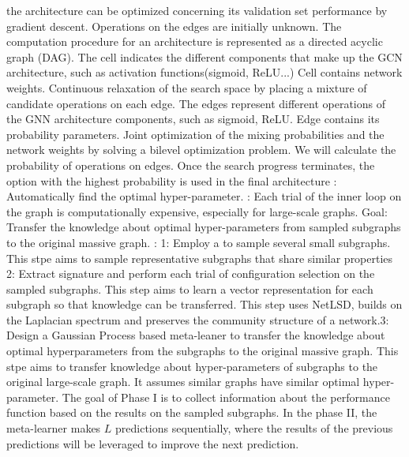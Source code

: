 the architecture can be optimized concerning its validation set performance by gradient descent.  Operations on the edges are initially unknown. The computation procedure for an architecture is represented as a directed acyclic graph (DAG). The cell indicates the different components that make up the GCN architecture, such as activation functions(sigmoid, ReLU...) Cell contains network weights.  Continuous relaxation of the search space by placing a mixture of candidate operations on each edge. The edges represent different operations of the GNN architecture components, such as sigmoid, ReLU. Edge contains its probability parameters.  Joint optimization of the mixing probabilities and the network weights by solving a bilevel optimization problem. We will calculate the probability of operations on edges. Once the search progress terminates, the option with the highest probability is used in the final architecture :  Automatically find the optimal hyper-parameter. : Each trial of the inner loop on the graph is computationally expensive, especially for large-scale graphs. Goal: Transfer the knowledge about optimal hyper-parameters from sampled subgraphs to the original massive graph. : 1: Employ a  to sample several small subgraphs. This stpe aims to sample representative subgraphs that share similar properties 2: Extract signature and perform each trial of configuration selection on the sampled subgraphs. This step aims to learn a vector representation for each subgraph so that knowledge can be transferred. This step uses NetLSD, builds on the Laplacian spectrum and preserves the community structure of a network.3: Design a Gaussian Process based meta-leaner to transfer the knowledge about optimal hyperparameters from the subgraphs to the original massive graph. This stpe aims to transfer knowledge about hyper-parameters of subgraphs to the original large-scale graph. It assumes similar graphs have similar optimal hyper- parameter.
   The goal of Phase I is to collect information about the performance function based on the results on the sampled subgraphs.  In the phase II, the meta-learner makes $L$ predictions sequentially, where the results of the previous predictions will be leveraged to improve the next prediction.